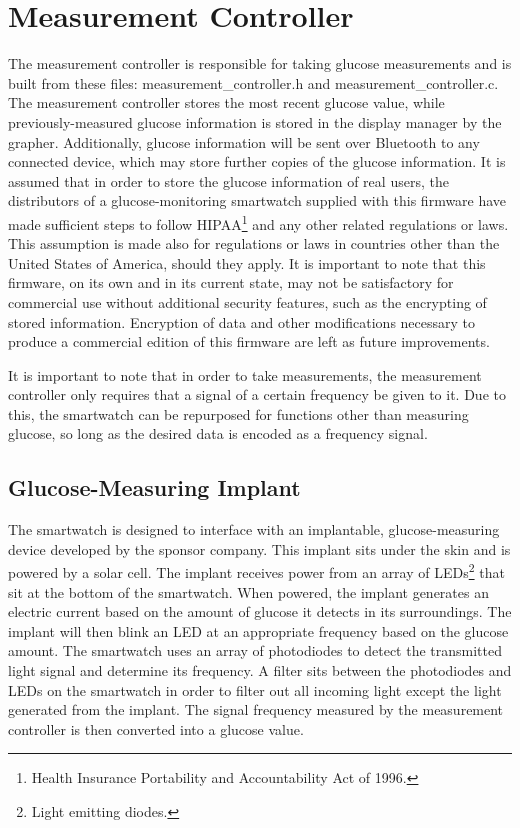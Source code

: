 \section{Measurement Controller}
The measurement controller is responsible for taking glucose measurements and is built from these files: measurement\_controller.h and measurement\_controller.c. The measurement controller stores the most recent glucose value, while previously-measured glucose information is stored in the display manager by the grapher. Additionally, glucose information will be sent over Bluetooth to any connected device, which may store further copies of the glucose information. It is assumed that in order to store the glucose information of real users, the distributors of a glucose-monitoring smartwatch supplied with this firmware have made sufficient steps to follow HIPAA\footnote{Health Insurance Portability and Accountability Act of 1996.\cite{HIPAA}} and any other related regulations or laws. This assumption is made also for regulations or laws in countries other than the United States of America, should they apply. It is important to note that this firmware, on its own and in its current state, may not be satisfactory for commercial use without additional security features, such as the encrypting of stored information. Encryption of data and other modifications necessary to produce a commercial edition of this firmware are left as future improvements.

It is important to note that in order to take measurements, the measurement controller only requires that a signal of a certain frequency be given to it. Due to this, the smartwatch can be repurposed for functions other than measuring glucose, so long as the desired data is encoded as a frequency signal.

\subsection{Glucose-Measuring Implant}
The smartwatch is designed to interface with an implantable, glucose-measuring device developed by the sponsor company. This implant sits under the skin and is powered by a solar cell. The implant receives power from an array of LEDs\footnote{Light emitting diodes.} that sit at the bottom of the smartwatch. When powered, the implant generates an electric current based on the amount of glucose it detects in its surroundings. The implant will then blink an LED at an appropriate frequency based on the glucose amount. The smartwatch uses an array of photodiodes to detect the transmitted light signal and determine its frequency. A filter sits between the photodiodes and LEDs on the smartwatch in order to filter out all incoming light except the light generated from the implant. The signal frequency measured by the measurement controller is then converted into a glucose value.

